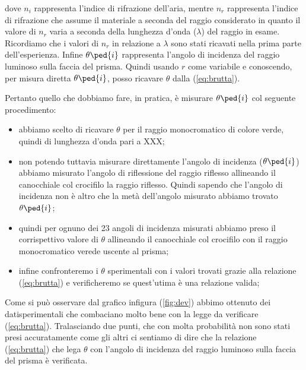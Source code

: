 dove $n_i$ rappresenta l'indice di rifrazione dell'aria, mentre $n_r$ rappresenta l'indice di rifrazione che assume il materiale a seconda del raggio considerato in quanto il valore di $n_r$ varia a seconda della lunghezza d'onda ($\lambda$) del raggio in esame. Ricordiamo che i valori di $n_r$ in relazione a $\lambda$ sono stati ricavati nella prima parte dell'esperienza. Infine $\theta\ped{i}$ rappresenta l'angolo di incidenza del raggio luminoso sulla faccia del prisma.
Quindi usando $r$ come variabile e conoscendo, per misura diretta $\theta\ped{i}$, posso ricavare $\theta$ dalla (\ref{eq:brutta}).

Pertanto quello che dobbiamo fare, in pratica, è misurare $\theta\ped{i}$ col seguente procedimento:

\begin{itemize}
	\item{abbiamo scelto di ricavare $\theta$ per il raggio monocromatico di colore verde, quindi di lunghezza d'onda pari a XXX;}
	\item{non potendo tuttavia misurare direttamente l'angolo di incidenza ($\theta\ped{i}$) abbiamo misurato l'angolo di riflessione del raggio riflesso allineando il canocchiale col crocifilo la raggio riflesso. Quindi sapendo che l'angolo di incidenza non è altro che la metà dell'angolo misurato abbiamo trovato $\theta\ped{i}$;}
	\item{quindi per ognuno dei 23 angoli di incidenza misurati abbiamo preso il corrispettivo valore di $\theta$ allineando il canocchiale col crocifilo con il raggio monocromatico verede uscente al prisma;}
	\item{infine confronteremo i $\theta$ sperimentali con i valori trovati grazie alla relazione (\ref{eq:brutta}) e verificheremo se quest'utima è una relazione valida;}
\end{itemize}

Come si può osservare dal grafico infigura (\ref{fig:dev}) abbimo ottenuto dei datisperimentali che combaciano molto bene con la legge da verificare (\ref{eq:brutta}). Tralasciando due punti, che con molta probabilità non sono stati presi accuratamente come gli altri ci sentiamo di dire che la relazione (\ref{eq:brutta}) che lega $\theta$ con l'angolo di incidenza del raggio luminoso sulla faccia del prisma è verificata.

